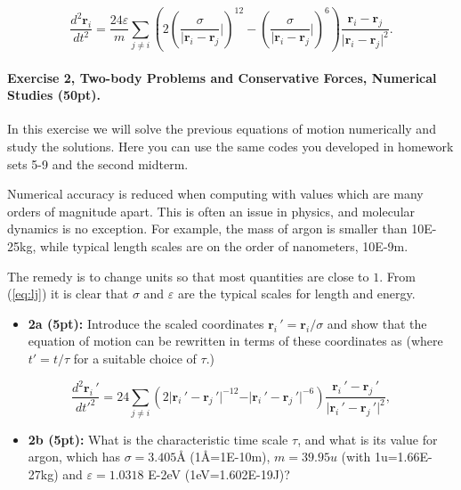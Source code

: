 \documentclass[%
oneside,                 %
final,                   %
10pt]{article}
\begin{document}
\noindent
\[
  \frac{d^2\bm{r}_i}{dt^2} = \frac{24\varepsilon}{m} \sum_{j \neq i} \left(2(\frac{\sigma}{\vert\bm{r}_i-\bm{r}_j}\vert)^{12}-(\frac{\sigma}{\vert\bm{r}_i-\bm{r}_j}\vert)^6\right)\frac{\bm{r}_i-\bm{r}_j}{\vert\bm{r}_i-\bm{r}_j\vert^2}.
\]

\paragraph{Exercise 2, Two-body Problems and Conservative Forces, Numerical Studies (50pt).}
In this exercise we will solve the previous equations of motion numerically and study the solutions.
Here you can use the same codes you developed in homework sets 5-9 and the second midterm.

Numerical accuracy is reduced when computing with values which are
many orders of magnitude apart. This is often an issue in physics, and
molecular dynamics is no exception. For example, the mass of argon is
smaller than 10E-25kg, while typical length scales are
on the order of nanometers, 10E-9m.

The remedy is to change units so that most quantities are close to
$1$. From (\ref{eq:lj}) it is clear that $\sigma$ and $\varepsilon$
are the typical scales for length and energy.

\begin{itemize}
\item \textbf{2a (5pt):} Introduce the scaled coordinates $\bm{r}_i\,'=\bm{r}_i/\sigma$ and show that the equation of motion can be rewritten in terms of these coordinates as (where $t'=t/\tau$ for a suitable choice of $\tau$.)
\end{itemize}

\noindent
\begin{equation}
\frac{d^2\bm{r}_i\,'}{{dt'^2}} = 24 \sum_{j \neq i} \left(2\vert\bm{r}_i\,'-\bm{r}_j\,'\vert^{-12}-\vert\bm{r}_i\,'-\bm{r}_j\,'\vert^{-6}\right)\frac{\bm{r}_i\,'-\bm{r}_j\,'}{\vert\bm{r}_i\,'-\bm{r}_j\,'\vert^2}, \label{eq:undim}
\end{equation}
\begin{itemize}
\item \textbf{2b (5pt):} What is the characteristic time scale $\tau$, and what is its value for argon, which has $\sigma=3.405$Å (1Å=1E-10m), $m = 39.95u$ (with 1u=1.66E-27kg) and $\varepsilon=1.0318$ E-2eV (1eV=1.602E-19J)?
\end{itemize}
\end{document}
